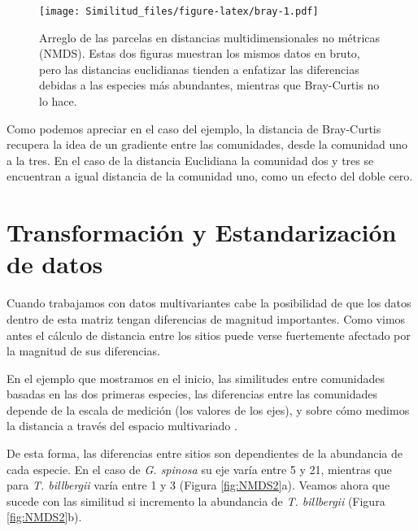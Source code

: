 \documentclass[]{book}
\begin{document}
\begin{figure}[htbp]
\centering
\texttt{[image: Similitud\_files/figure-latex/bray-1.pdf]}
\caption{\label{fig:bray}Arreglo de las parcelas en distancias
multidimensionales no métricas (NMDS). Estas dos figuras muestran los
mismos datos en bruto, pero las distancias euclidianas tienden a
enfatizar las diferencias debidas a las especies más abundantes,
mientras que Bray-Curtis no lo hace.}
\end{figure}

Como podemos apreciar en el caso del ejemplo, la distancia de
Bray-Curtis recupera la idea de un gradiente entre las comunidades,
desde la comunidad uno a la tres. En el caso de la distancia Euclidiana
la comunidad dos y tres se encuentran a igual distancia de la comunidad
uno, como un efecto del doble cero.

\chapter{Transformación y Estandarización de
datos}\label{transformacion-y-estandarizacion-de-datos}

Cuando trabajamos con datos multivariantes cabe la posibilidad de que
los datos dentro de esta matriz tengan diferencias de magnitud
importantes. Como vimos antes el cálculo de distancia entre los sitios
puede verse fuertemente afectado por la magnitud de sus diferencias.

En el ejemplo que mostramos en el inicio, las similitudes entre
comunidades basadas en las dos primeras especies, las diferencias entre
las comunidades depende de la escala de medición (los valores de los
ejes), y sobre cómo medimos la distancia a través del espacio
multivariado \citep{Stevens2009}.

De esta forma, las diferencias entre sitios son dependientes de la
abundancia de cada especie. En el caso de \emph{G. spinosa} su eje varía
entre 5 y 21, mientras que para \emph{T. billbergii} varía entre 1 y 3
(Figura \ref{fig:NMDS2}a). Veamos ahora que sucede con las similitud si
incremento la abundancia de \emph{T. billbergii} (Figura
\ref{fig:NMDS2}b).
\end{document}
